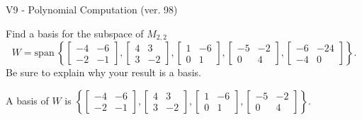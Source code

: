 \begin{exercise}
  \begin{exerciseTitle}V9 - Polynomial Computation (ver. 98)\end{exerciseTitle}
  \begin{exerciseStatement}
    Find a basis for the subspace of \(M_{2,2}\) 
\[W=\mathrm{span}\ \left\{\left[\begin{array}{cc}
-4 & -6 \\
-2 & -1
\end{array}\right] , \left[\begin{array}{cc}
4 & 3 \\
3 & -2
\end{array}\right] , \left[\begin{array}{cc}
1 & -6 \\
0 & 1
\end{array}\right] , \left[\begin{array}{cc}
-5 & -2 \\
0 & 4
\end{array}\right] , \left[\begin{array}{cc}
-6 & -24 \\
-4 & 0
\end{array}\right]\right\}.\]
 Be sure to explain why your result is a basis.


  \end{exerciseStatement}
  \begin{exerciseAnswer}
   A basis of \(W\) is  \(\left\{\left[\begin{array}{cc}
-4 & -6 \\
-2 & -1
\end{array}\right] , \left[\begin{array}{cc}
4 & 3 \\
3 & -2
\end{array}\right] , \left[\begin{array}{cc}
1 & -6 \\
0 & 1
\end{array}\right] , \left[\begin{array}{cc}
-5 & -2 \\
0 & 4
\end{array}\right]\right\}\).
  


  \end{exerciseAnswer}
\end{exercise}